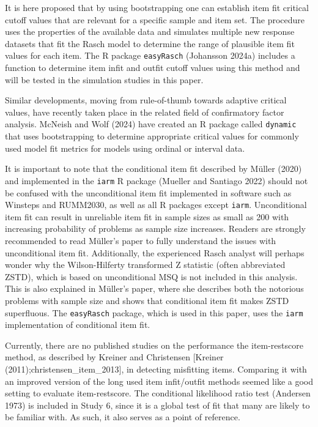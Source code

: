 \documentclass[
  letterpaper,
  DIV=11,
  numbers=noendperiod]{scrartcl}
\begin{document}
It is here proposed that by using bootstrapping one can establish item
fit critical cutoff values that are relevant for a specific sample and
item set. The procedure uses the properties of the available data and
simulates multiple new response datasets that fit the Rasch model to
determine the range of plausible item fit values for each item. The R
package \texttt{easyRasch} (Johansson 2024a) includes a function to
determine item infit and outfit cutoff values using this method and will
be tested in the simulation studies in this paper.

Similar developments, moving from rule-of-thumb towards adaptive
critical values, have recently taken place in the related field of
confirmatory factor analysis. McNeish and Wolf (2024) have created an R
package called \texttt{dynamic} that uses bootstrapping to determine
appropriate critical values for commonly used model fit metrics for
models using ordinal or interval data.

It is important to note that the conditional item fit described by
Müller (2020) and implemented in the \texttt{iarm} R package (Mueller
and Santiago 2022) should not be confused with the unconditional item
fit implemented in software such as Winsteps and RUMM2030, as well as
all R packages except \texttt{iarm}. Unconditional item fit can result
in unreliable item fit in sample sizes as small as 200 with increasing
probability of problems as sample size increases. Readers are strongly
recommended to read Müller's paper to fully understand the issues with
unconditional item fit. Additionally, the experienced Rasch analyst will
perhaps wonder why the Wilson-Hilferty transformed Z statistic (often
abbreviated ZSTD), which is based on unconditional MSQ is not included
in this analysis. This is also explained in Müller's paper, where she
describes both the notorious problems with sample size and shows that
conditional item fit makes ZSTD superfluous. The \texttt{easyRasch}
package, which is used in this paper, uses the \texttt{iarm}
implementation of conditional item fit.

Currently, there are no published studies on the performance the
item-restscore method, as described by Kreiner and Christensen
{[}Kreiner (2011);christensen\_item\_2013{]}, in detecting misfitting
items. Comparing it with an improved version of the long used item
infit/outfit methods seemed like a good setting to evaluate
item-restscore. The conditional likelihood ratio test (Andersen 1973) is
included in Study 6, since it is a global test of fit that many are
likely to be familiar with. As such, it also serves as a point of
reference.
\end{document}
